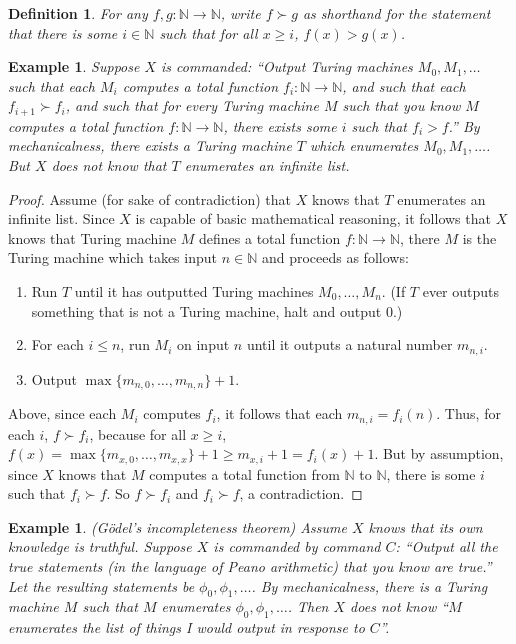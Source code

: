 \documentclass{article}
\newtheorem{definition}[theorem]{Definition}
\newtheorem{example}[theorem]{Example}
\begin{document}
\begin{definition}
\label{functionsuccdefn}
For any $f,g:\mathbb N\to\mathbb N$, write $f\succ g$ as shorthand for the statement
that there is some $i\in\mathbb N$ such that for all $x\geq i$, $f(x)>g(x)$.
\end{definition}

\begin{example}
\label{counterintuitiveexample1}
    Suppose $X$ is commanded: ``Output Turing machines $M_0,M_1,\ldots$
    such that each $M_i$ computes a total function $f_i:\mathbb N\to\mathbb N$,
    and such that each $f_{i+1}\succ f_i$, and such that for every Turing machine $M$
    such that you know $M$ computes a total function $f:\mathbb N\to\mathbb N$,
    there exists some $i$ such that $f_i>f$.'' By \emph{mechanicalness}, there
    exists a Turing machine $T$ which enumerates $M_0,M_1,\ldots$.
    But $X$ does not know that $T$ enumerates an infinite list.
\end{example}

\begin{proof}
    Assume (for sake of contradiction) that $X$ knows that $T$ enumerates an
    infinite list. Since $X$ is capable of basic mathematical reasoning, it follows
    that $X$ knows that Turing machine $M$ defines a total function $f:\mathbb N\to\mathbb N$,
    there $M$ is the Turing machine which takes input $n\in\mathbb N$ and proceeds as
    follows:
    \begin{enumerate}
        \item
        Run $T$ until it has outputted Turing machines $M_0,\ldots,M_n$. (If $T$
        ever outputs something that is not a Turing machine, halt and output $0$.)
        \item
        For each $i\leq n$, run $M_i$ on input $n$ until it outputs a natural
        number $m_{n,i}$.
        \item
        Output $\max\{m_{n,0},\ldots,m_{n,n}\}+1$.
    \end{enumerate}
    Above, since each $M_i$ computes $f_i$, it follows that each $m_{n,i}=f_i(n)$.
    Thus, for each $i$, $f\succ f_i$, because for all $x\geq i$,
    $f(x)=\max\{m_{x,0},\ldots,m_{x,x}\}+1\geq m_{x,i}+1=f_i(x)+1$.
    But by assumption, since $X$ knows that $M$ computes a total function from
    $\mathbb N$ to $\mathbb N$, there is some $i$ such that
    $f_i\succ f$. So $f\succ f_i$ and $f_i\succ f$, a contradiction.
\end{proof}

\begin{example}
\label{counterintuitiveexample2}
    (G\"odel's incompleteness theorem)
    Assume $X$ knows that its own knowledge is truthful.
    Suppose $X$ is commanded by command $C$:
    ``Output all the true statements (in the language of
    Peano arithmetic) that you know are true.'' Let the resulting statements be
    $\phi_0,\phi_1,\ldots$. By \emph{mechanicalness}, there is a Turing machine $M$
    such that $M$ enumerates $\phi_0,\phi_1,\ldots$. Then $X$ does not know
    ``$M$ enumerates the list of things I would output in response to $C$''.
\end{example}
\end{document}

